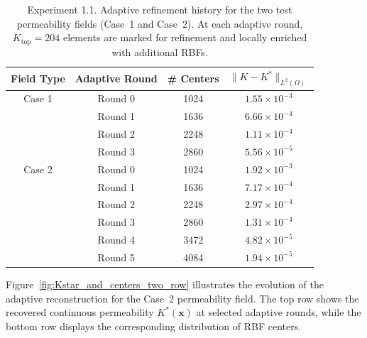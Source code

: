\documentclass[final,1p,times]{elsarticle}
\theoremstyle{plain}
\theoremstyle{definition}
\theoremstyle{remark}
\newcommand{\bx}{\mathbf{x}}
\begin{document}
\begin{table}[!h]
\centering
\begin{tabular}{|c|c|c|c|}
\hline
{Field Type} & 
{Adaptive Round} & 
{\# Centers} & 
{$\|K-K^*\|_{L^2(\Omega)}$}  \\ \hline
Case 1 & Round 0 & 1024 & $1.55 \times 10^{-3}$  \\ 
       & Round 1 & 1636 & $6.66 \times10^{-4}$  \\ 
       & Round 2 & 2248 & $1.11 \times10^{-4}$  \\
       & Round 3 & 2860 & $5.56 \times10^{-5}$  \\
        \hline \hline
Case 2 & Round 0 & 1024 & $1.92 \times 10^{-3}$  \\ 
       & Round 1 & 1636 & $7.17 \times10^{-4}$  \\ 
       & Round 2 & 2248 & $2.97 \times10^{-4}$  \\
       & Round 3 & 2860 & $1.31 \times10^{-4}$  \\
       & Round 4 & 3472 & $4.82 \times10^{-5}$  \\
       & Round 5 & 4084 & $1.94 \times10^{-5}$  \\
       \hline
\end{tabular}
\caption{Experiment 1.1. Adaptive refinement history for the two test permeability fields (Case~1 and Case~2). At each adaptive round, $K_{\mathrm{top}}=204$ elements are marked for refinement and locally enriched with additional RBFs.}

\label{tab:adaptive_summary}
\end{table}

Figure~\ref{fig:Kstar_and_centers_two_row} illustrates the evolution of the
adaptive reconstruction for the Case~2 permeability field.
The top row shows the recovered continuous permeability $K^*(\bx)$ at selected
adaptive rounds, while the bottom row displays the corresponding distribution of
RBF centers.
\end{document}
